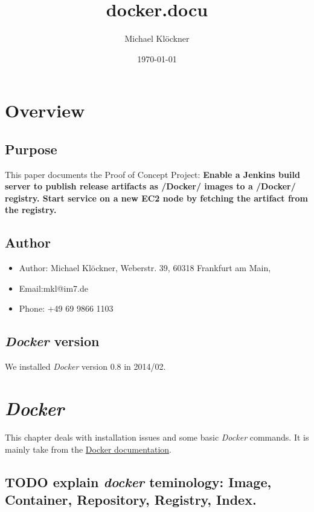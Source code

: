 \documentclass[11pt]{article}
\title{docker.docu}
\author{Michael Klöckner}
\date{\today}
\begin{document}
\maketitle

\setcounter{tocdepth}{3}
\tableofcontents
\vspace*{1cm}


\section{Overview}
\label{sec-1}
\subsection{Purpose}
\label{sec-1-1}

This paper documents the Proof of Concept Project:
\textbf{Enable a Jenkins build server to publish release artifacts as /Docker/ images to a /Docker/ registry. Start service on a new EC2 node by fetching the artifact from the registry.}
\subsection{Author}
\label{sec-1-2}

\begin{itemize}
\item Author: Michael Klöckner, Weberstr. 39, 60318 Frankfurt am Main,
\item Email:mkl@im7.de
\item Phone: +49 69 9866 1103
\end{itemize}
\subsection{\emph{Docker} version}
\label{sec-1-3}

   We installed \emph{Docker} version 0.8 in 2014/02.
\section{\emph{Docker}}
\label{sec-2}

This chapter deals with installation issues and some basic \emph{Docker} commands. It is mainly take from the \href{http://docs.docer.io/en/latest/}{Docker documentation}. 
\subsection{\textbf{TODO} explain \emph{docker} teminology: Image, Container, Repository, Registry, Index.}
\label{sec-2-1}
\end{document}
